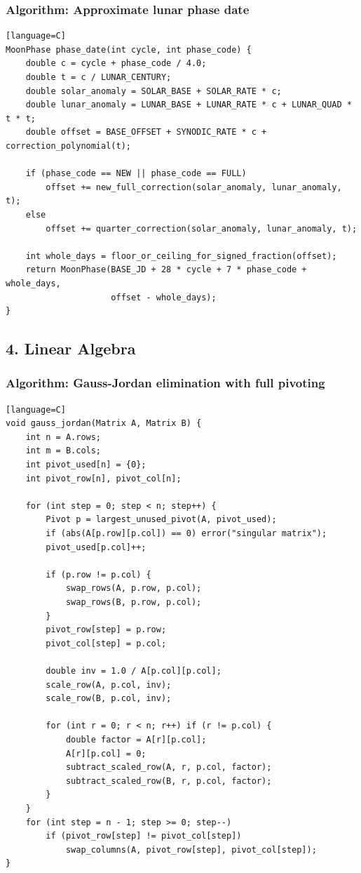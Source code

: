 \documentclass[11pt]{article}
\begin{document}
\subsubsection{Algorithm: Approximate lunar phase date}\label{algorithm-approximate-lunar-phase-date}

\begin{verbatim}[language=C]
MoonPhase phase_date(int cycle, int phase_code) {
    double c = cycle + phase_code / 4.0;
    double t = c / LUNAR_CENTURY;
    double solar_anomaly = SOLAR_BASE + SOLAR_RATE * c;
    double lunar_anomaly = LUNAR_BASE + LUNAR_RATE * c + LUNAR_QUAD * t * t;
    double offset = BASE_OFFSET + SYNODIC_RATE * c + correction_polynomial(t);

    if (phase_code == NEW || phase_code == FULL)
        offset += new_full_correction(solar_anomaly, lunar_anomaly, t);
    else
        offset += quarter_correction(solar_anomaly, lunar_anomaly, t);

    int whole_days = floor_or_ceiling_for_signed_fraction(offset);
    return MoonPhase(BASE_JD + 28 * cycle + 7 * phase_code + whole_days,
                     offset - whole_days);
}
\end{verbatim}

\subsection{4. Linear Algebra}\label{linear-algebra}

\subsubsection{Algorithm: Gauss-Jordan elimination with full pivoting}\label{algorithm-gauss-jordan-elimination-with-full-pivoting}

\begin{verbatim}[language=C]
void gauss_jordan(Matrix A, Matrix B) {
    int n = A.rows;
    int m = B.cols;
    int pivot_used[n] = {0};
    int pivot_row[n], pivot_col[n];

    for (int step = 0; step < n; step++) {
        Pivot p = largest_unused_pivot(A, pivot_used);
        if (abs(A[p.row][p.col]) == 0) error("singular matrix");
        pivot_used[p.col]++;

        if (p.row != p.col) {
            swap_rows(A, p.row, p.col);
            swap_rows(B, p.row, p.col);
        }
        pivot_row[step] = p.row;
        pivot_col[step] = p.col;

        double inv = 1.0 / A[p.col][p.col];
        scale_row(A, p.col, inv);
        scale_row(B, p.col, inv);

        for (int r = 0; r < n; r++) if (r != p.col) {
            double factor = A[r][p.col];
            A[r][p.col] = 0;
            subtract_scaled_row(A, r, p.col, factor);
            subtract_scaled_row(B, r, p.col, factor);
        }
    }
    for (int step = n - 1; step >= 0; step--)
        if (pivot_row[step] != pivot_col[step])
            swap_columns(A, pivot_row[step], pivot_col[step]);
}
\end{verbatim}
\end{document}
